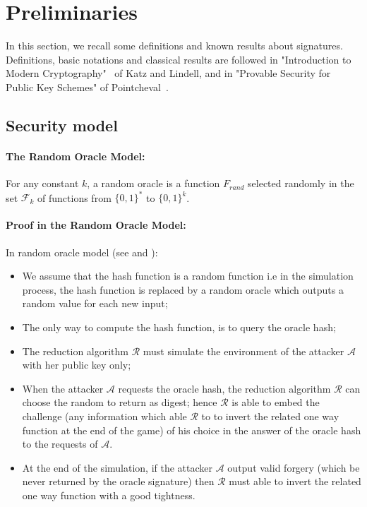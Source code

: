 \documentclass[a4paper,11pt]{article}
\begin{document}
\section{Preliminaries}\label{sect:2}
In this section, we recall some definitions and known results about signatures.
Definitions, basic notations and classical results are followed in "Introduction to Modern Cryptography"~\cite{Katz}
of Katz and Lindell, and  in "Provable Security for Public Key Schemes" of Pointcheval~\cite{Pointcheval}.

\subsection{Security model}\label{sec:one:1}

\paragraph{The Random Oracle Model:}

For any constant $k$, a random oracle is a function $F_{rand}$ selected randomly in the set $\mathcal{F}_{k}$ of functions from $\{0,1\}^{*}$ to $\{0,1\}^{k}$.

\vspace{0.2cm}

\paragraph{Proof in the Random Oracle Model:}

In random oracle model (see \cite{Bellare1} and \cite{Canetti}):
\begin{itemize}
\item We assume that the hash function is a random function i.e in the simulation process, the hash function is replaced by a random oracle which outputs a random value for each new input;
\item The only way to compute the hash function, is to query the oracle hash;
\item The reduction algorithm $\mathcal{R}$ must simulate the  environment of the attacker $\mathcal{A}$ with her public key only;
\item  When the attacker $\mathcal{A}$ requests the oracle hash,
 the reduction algorithm $\mathcal{R}$ can choose the random to return as digest; hence $\mathcal{R}$
is able to embed the challenge (any information which able $\mathcal{R}$ to to invert the related one way function at the end of the game)   of his choice in the answer of the oracle hash to the requests of  $\mathcal{A}$.
\item  At the end of the simulation, if the attacker $\mathcal{A}$ output valid
 forgery (which be never returned by the oracle signature) then $\mathcal{R}$
 must able to invert the related one way function with a good tightness.
\end{itemize}
\end{document}
